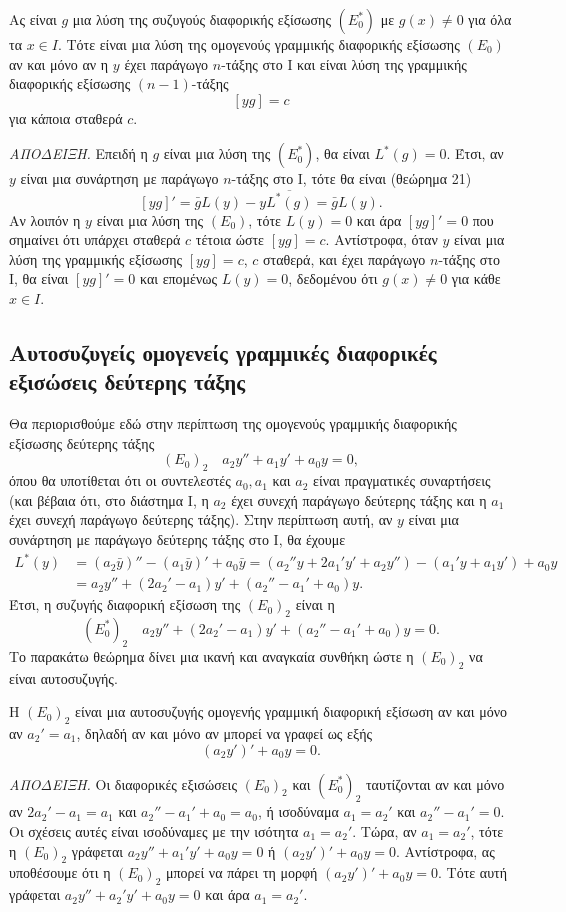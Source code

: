 \documentclass[11pt,a4paper,twoside]{book}
\newcommand{\titlefont}[1]{{\fontfamily{maksf}\selectfont #1}}
\newcounter{thewrhma}[chapter]
\renewcommand{\thethewrhma}{\thechapter.\arabic{thewrhma}}
\newcommand{\thewr}{\refstepcounter{thewrhma}{\bf\titlefont{\textcolor{secondarycolor}{\large Θεώρημα\hspace{2mm}\thethewrhma}}}\hspace{1mm}}{}
\newenvironment{Thewrhma}[1]
{\begin{tcolorbox}[title=\thewr\ \ :\ \  {\textcolor{black}{\bf{\large\titlefont{#1}}}},
breakable,
enhanced standard,
titlerule=-.2pt,
toprule=0pt, 
rightrule=0pt, 
bottomrule=0pt,
colback=white,
left=2mm,
top=1mm,
bottom=0mm,
boxrule=0pt,
colframe=white,
borderline west={1.5mm}{0pt}{secondarycolor},
leftrule=2mm,
sharp corners,
coltitle=secondarycolor]}
{\end{tcolorbox}}
\begin{document}
\begin{Thewrhma}{}
Ας είναι $g$ μια λύση της συζυγούς διαφορικής εξίσωσης $(E_0^*)$ με $g(x)\neq 0$ για όλα τα $x\in I$. Τότε είναι μια λύση της ομογενούς γραμμικής διαφορικής εξίσωσης $(E_0)$ αν και μόνο αν η $y$ έχει παράγωγο $n$-τάξης στο Ι και είναι λύση της γραμμικής διαφορικής εξίσωσης $(n-1)$-τάξης
\[
    [yg]=c
\]
για κάποια σταθερά $c$.
\end{Thewrhma}
\textit{ΑΠΟΔΕΙΞΗ.} Επειδή η $g$ είναι μια λύση της $(E_0^*)$, θα είναι $L^*(g)=0$. Έτσι, αν $y$ είναι μια συνάρτηση με παράγωγο $n$-τάξης στο Ι, τότε θα είναι (θεώρημα 21)
\[
    [yg]'=\bar{g}L(y)-y\overline{L^*(g)}=\bar{g}L(y).
\]
Αν λοιπόν η $y$ είναι μια λύση της $(E_0)$, τότε $L(y)=0$ και άρα $[yg]'=0$ που σημαίνει ότι υπάρχει σταθερά $c$ τέτοια ώστε $[yg]=c$. Αντίστροφα, όταν $y$ είναι μια λύση της γραμμικής εξίσωσης $[yg]=c$, $c$ σταθερά, και έχει παράγωγο $n$-τάξης στο Ι, θα είναι $[yg]'=0$ και επομένως $L(y)=0$, δεδομένου ότι $g(x)\neq 0$ για κάθε $x\in I$.

\subsection{Αυτοσυζυγείς ομογενείς γραμμικές διαφορικές εξισώσεις δεύτερης τάξης}
Θα περιορισθούμε εδώ στην περίπτωση της ομογενούς γραμμικής διαφορικής εξίσωσης δεύτερης τάξης
\begin{equation*}
    (E_0)_2 \quad a_2y''+a_1y'+a_0y=0,
\end{equation*}
όπου θα υποτίθεται ότι οι συντελεστές $a_0, a_1$ και $a_2$ είναι πραγματικές συναρτήσεις (και βέβαια ότι, στο διάστημα Ι, η $a_2$ έχει συνεχή παράγωγο δεύτερης τάξης και η $a_1$ έχει συνεχή παράγωγο δεύτερης τάξης). Στην περίπτωση αυτή, αν $y$ είναι μια συνάρτηση με παράγωγο δεύτερης τάξης στο Ι, θα έχουμε
\begin{align*}
    L^*(y) &= (a_2\bar{y})''-(a_1\bar{y})'+a_0\bar{y} = (a_2''y+2a_1'y'+a_2y'')-(a_1'y+a_1y')+a_0y \\
    &= a_2y''+(2a_2'-a_1)y'+(a_2''-a_1'+a_0)y.
\end{align*}
Έτσι, η συζυγής διαφορική εξίσωση της $(E_0)_2$ είναι η
\begin{equation*}
    (E_0^*)_2 \quad a_2y''+(2a_2'-a_1)y'+(a_2''-a_1'+a_0)y=0.
\end{equation*}
Το παρακάτω θεώρημα δίνει μια ικανή και αναγκαία συνθήκη ώστε η $(E_0)_2$ να είναι αυτοσυζυγής.

\begin{Thewrhma}{}
Η $(E_0)_2$ είναι μια αυτοσυζυγής ομογενής γραμμική διαφορική εξίσωση αν και μόνο αν $a_2'=a_1$, δηλαδή αν και μόνο αν μπορεί να γραφεί ως εξής
\[
    (a_2y')'+a_0y=0.
\]
\end{Thewrhma}
\textit{ΑΠΟΔΕΙΞΗ.} Οι διαφορικές εξισώσεις $(E_0)_2$ και $(E_0^*)_2$ ταυτίζονται αν και μόνο αν $2a_2'-a_1=a_1$ και $a_2''-a_1'+a_0=a_0$, ή ισοδύναμα $a_1=a_2'$ και $a_2''-a_1'=0$. Οι σχέσεις αυτές είναι ισοδύναμες με την ισότητα $a_1=a_2'$. Τώρα, αν $a_1=a_2'$, τότε η $(E_0)_2$ γράφεται $a_2y''+a_1'y'+a_0y=0$ ή $(a_2y')'+a_0y=0$. Αντίστροφα, ας υποθέσουμε ότι η $(E_0)_2$ μπορεί να πάρει τη μορφή $(a_2y')'+a_0y=0$. Τότε αυτή γράφεται $a_2y''+a_2'y'+a_0y=0$ και άρα $a_1=a_2'$.
\end{document}
